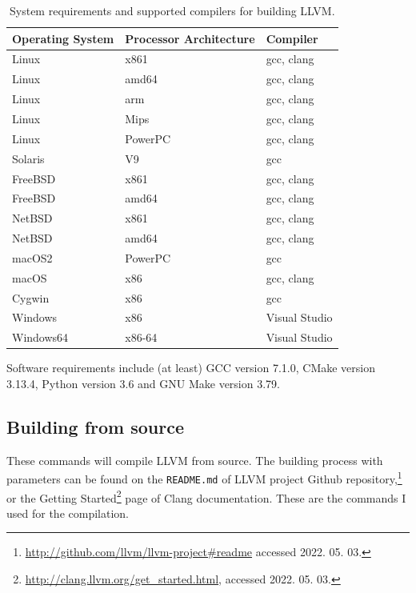 \begin{table}[H]
	\centering
	\begin{tabular}{ | m{} | m{} | m{} | }
		\hline
		\textbf{Operating System} & \textbf{Processor Architecture} & \textbf{Compiler} \\
		\hline \hline
		Linux & x861 & gcc, clang \\
		\hline
		Linux & amd64 & gcc, clang \\
		\hline
		Linux & arm & gcc, clang \\
		\hline
		Linux & Mips & gcc, clang \\
		\hline
		Linux & PowerPC & gcc, clang \\
		\hline
		Solaris & V9 & gcc \\
		\hline
		FreeBSD & x861 & gcc, clang \\
		\hline
		FreeBSD & amd64 & gcc, clang \\
		\hline
		NetBSD & x861 & gcc, clang \\
		\hline
		NetBSD & amd64 & gcc, clang \\
		\hline
		macOS2 & PowerPC & gcc \\
		\hline
		macOS & x86 & gcc, clang \\
		\hline
		Cygwin & x86 & gcc \\
		\hline
		Windows & x86 & Visual Studio \\
		\hline
		Windows64 & x86-64 & Visual Studio \\
		\hline
	\end{tabular}
	\caption{System requirements and supported compilers for building LLVM.}
	\label{tab:clang-req}
\end{table}

Software requirements include (at least) GCC version 7.1.0, CMake version 3.13.4, Python version 3.6 and GNU Make version 3.79.

\subsection{Building from source}

These commands will compile LLVM from source. The building process with parameters can be found on the \texttt{README.md} of
LLVM project Github repository,\footnote{\url{http://github.com/llvm/llvm-project\#readme} accessed 2022. 05. 03.} or the Getting
Started\footnote{\url{http://clang.llvm.org/get_started.html}, accessed 2022. 05. 03.} page of Clang documentation. These are the commands I used for
the compilation.

